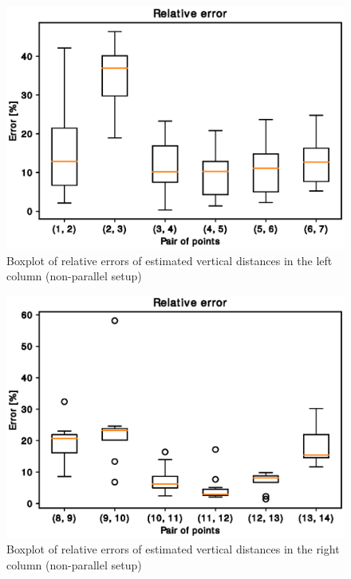 \begin{figure}
\includegraphics[width=\linewidth]{experiments/63/leftcolumn1.eps}
\caption{Boxplot of relative errors of estimated vertical distances in the left column (non-parallel setup)}
\label{table:63left}
\end{figure}

\begin{figure}
\includegraphics[width=\linewidth]{experiments/63/rightcolumn1.eps}
\caption{Boxplot of relative errors of estimated vertical distances in the right column (non-parallel setup)}
\label{table:63right}
\end{figure}

